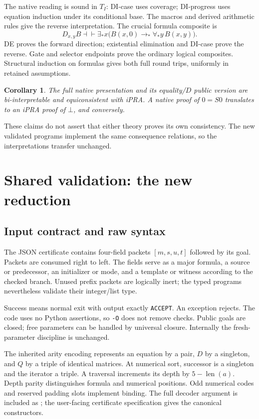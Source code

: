\documentclass[11pt]{article}
\newtheorem{corollary}[theorem]{Corollary}
\theoremstyle{definition}\newtheorem{definition}[theorem]{Definition}
\theoremstyle{remark}\newtheorem{remark}[theorem]{Remark}
\begin{document}
The native reading is sound in $T_I$: DI-case uses coverage;
DI-progress uses equation induction under its conditional base.
The macros and derived arithmetic rules give the reverse
interpretation. The crucial formula composite is
\[
 D_{x,y}B\dashv\vdash
 \exists_*x\bigl(B(x,0)\to_*\forall_*y\,B(x,y)\bigr).
\]
DE proves the forward direction; existential elimination and
DI-case prove the reverse. Gate and selector endpoints prove the
ordinary logical composites. Structural induction on formulas
gives both full round trips, uniformly in retained assumptions.

\begin{corollary}
The full native presentation and its equality/$D$ public version
are bi-interpretable and equiconsistent with iPRA. A native proof
of $0=S0$ translates to an iPRA proof of $\bot$, and conversely.
\end{corollary}
These claims do not assert that either theory proves its own
consistency. The new validated programs implement the same
consequence relations, so the interpretations transfer unchanged.

\section{Shared validation: the new reduction}\label{main:validation}

\subsection{Input contract and raw syntax}

The JSON certificate contains four-field packets $[m,s,u,t]$
followed by its goal. Packets are consumed right to left. The fields
serve as a major formula, a source or predecessor, an initializer
or mode, and a template or witness according to the checked branch.
Unused prefix packets are logically inert; the typed programs
nevertheless validate their integer/list type.

Success means normal exit with output exactly \texttt{ACCEPT}.
An exception rejects. The code uses no Python assertions, so
\texttt{-O} does not remove checks. Public goals are closed; free
parameters can be handled by universal closure. Internally the
fresh-parameter discipline is unchanged.

The inherited arity encoding represents an equation by a pair,
$D$ by a singleton, and $Q$ by a triple of identical matrices.
At numerical sort, successor is a singleton and the iterator a
triple. A traversal increments its depth by $5-\operatorname{len}(a)$.
Depth parity distinguishes formula and numerical positions.
Odd numerical codes and reserved padding slots implement binding.
The full decoder argument is included as
; the user-facing
certificate specification gives the canonical constructors.
\end{document}
